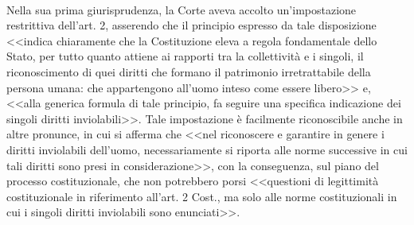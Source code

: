 \\Nella sua prima giurisprudenza, la Corte aveva accolto un’impostazione restrittiva dell’art. 2, asserendo che il principio espresso da tale disposizione <<indica chiaramente che la Costituzione eleva a regola fondamentale dello Stato, per tutto quanto attiene ai rapporti tra la collettività e i singoli, il riconoscimento di quei diritti che formano il patrimonio irretrattabile della persona umana: che appartengono all’uomo inteso come essere libero>> e, <<alla generica formula di tale principio, fa seguire una specifica indicazione dei singoli diritti inviolabili>>.
Tale impostazione è facilmente riconoscibile anche in altre pronunce, in cui si afferma che <<nel riconoscere e garantire in genere i diritti inviolabili dell’uomo, necessariamente si riporta alle norme successive in cui tali diritti sono presi in considerazione>>, con la conseguenza, sul piano del processo costituzionale, che non potrebbero porsi <<questioni di legittimità costituzionale in riferimento all’art. 2 Cost., ma solo alle norme costituzionali in cui i singoli diritti inviolabili sono enunciati>>.
